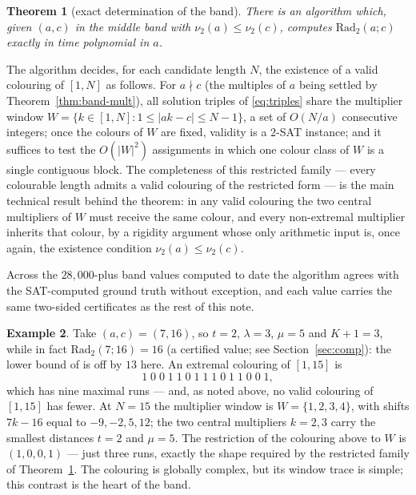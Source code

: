 \documentclass[11pt]{article}
\newtheorem{theorem}{Theorem}
\theoremstyle{remark}
\theoremstyle{definition}
\newtheorem{example}[theorem]{Example}
\newcommand{\Rad}{\mathrm{Rad}_2}
\newcommand{\vtwo}{\nu_2}
\begin{document}
\begin{theorem}[exact determination of the band]\label{thm:band-alg}
There is an algorithm which, given $(a,c)$ in the middle band with
$\vtwo(a) \le \vtwo(c)$, computes $\Rad(a;c)$ exactly in time polynomial in
$a$.
\end{theorem}

The algorithm decides, for each candidate length $N$, the existence of a
valid colouring of $[1,N]$ as follows. For $a \nmid c$ (the multiples of
$a$ being settled by Theorem~\ref{thm:band-mult}), all solution triples of
\eqref{eq:triples} share the multiplier window
$W = \{k \in [1,N] : 1 \le |ak - c| \le N-1\}$, a set of $O(N/a)$
consecutive integers; once the colours of $W$ are fixed, validity is a
$2$-{\upshape SAT} instance; and it suffices to test the $O(|W|^2)$
assignments in which one colour class of $W$ is a single contiguous block.
The completeness of this restricted family --- every colourable length
admits a valid colouring of the restricted form --- is the main technical
result behind the theorem: in any valid colouring the two central
multipliers of $W$ must receive the same colour, and every non-extremal
multiplier inherits that colour, by a rigidity argument whose only
arithmetic input is, once again, the existence condition
$\vtwo(a) \le \vtwo(c)$.

Across the $28{,}000$-plus band values computed to date the algorithm
agrees with the SAT-computed ground truth without exception, and each value
carries the same two-sided certificates as the rest of this note.

\begin{example}\label{ex:716}
Take $(a,c) = (7,16)$, so $t = 2$, $\lambda = 3$, $\mu = 5$ and $K+1 = 3$,
while in fact $\Rad(7;16) = 16$ (a certified value; see
Section~\ref{sec:comp}): the lower bound of \cite{DT2020} is off by
$13$ here. An extremal colouring of $[1,15]$ is
\[
1\;0\;0\;1\;1\;0\;1\;1\;1\;0\;1\;1\;0\;0\;1,
\]
which has nine maximal runs --- and, as noted above, no valid colouring of
$[1,15]$ has fewer. At $N = 15$ the multiplier window is
$W = \{1,2,3,4\}$, with shifts $7k - 16$ equal to $-9, -2, 5, 12$; the two
central multipliers $k = 2, 3$ carry the smallest distances $t = 2$ and
$\mu = 5$. The restriction of the colouring above to $W$ is $(1,0,0,1)$ ---
just three runs, exactly the shape required by the restricted family of
Theorem~\ref{thm:band-alg}. The colouring is globally complex, but its
window trace is simple; this contrast is the heart of the band.
\end{example}
\end{document}
